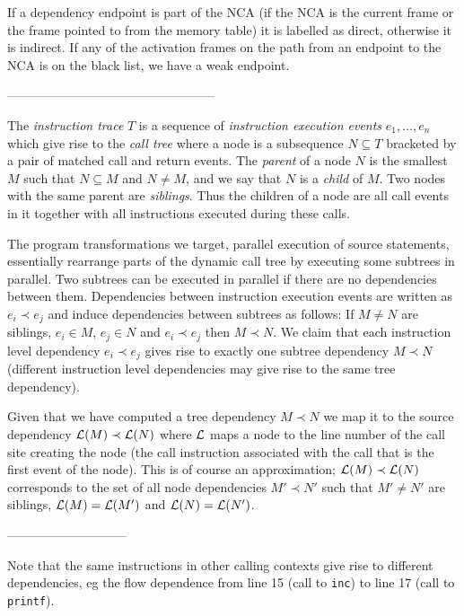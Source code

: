 If a dependency endpoint is part of the NCA (if the NCA is the current
frame or the frame pointed to from the memory table) it is labelled as
direct, otherwise it is indirect. If any of the activation frames on
the path from an endpoint to the NCA is on the black list, we have a
weak endpoint.

--------------------------------------------------



The {\em instruction trace} $T$ is a sequence of {\em instruction execution 
events} $e_1, \ldots, e_n$ which give rise to the {\em call tree} where a 
node is a subsequence $N \subseteq T$ bracketed by a pair of matched call 
and return events. The {\em parent} of a node $N$ is the smallest $M$ such
that $N \subseteq M$ and $N \not= M$, and we say that $N$ is a {\em child} 
of $M$. Two nodes with the same parent are {\em siblings}.
Thus the children of a node are all call events in it together 
with all instructions executed during these calls.

The program transformations we target, parallel execution of source statements,
essentially rearrange parts of the dynamic call tree by executing some subtrees 
in parallel. Two subtrees can be executed in parallel
if there are no dependencies between them. 
Dependencies between instruction execution events are written as $e_i \prec e_j$
and induce dependencies between subtrees as follows: If $M \not= N$ are 
siblings, $e_i \in M$, $e_j \in N$ and $e_i \prec e_j$ then $M \prec N$.
We claim that each instruction level dependency $e_i \prec e_j$ gives rise to 
exactly one subtree dependency $M \prec N$ (different instruction level 
dependencies may give rise to the same tree dependency).

\newcommand{\li}{{\cal L}}
Given that we have computed a tree dependency $M \prec N$ we map it to
the source dependency $\li(M) \prec \li(N)$ where $\li$ maps a node to the
line number of the call site creating the node (the call instruction associated 
with the call that is the first event of the node). This is of course an
approximation; $\li(M) \prec \li(N)$ corresponds to the set of all node
dependencies $M' \prec N'$ such that $M' \not= N'$ are siblings, $\li(M)=\li(M')$
and $\li(N)=\li(N')$.


-----------------------------

Note that the same instructions in other calling contexts give rise to 
different dependencies, eg the flow dependence from line 15 (call to {\tt inc})
to line 17 (call to {\tt printf}).
